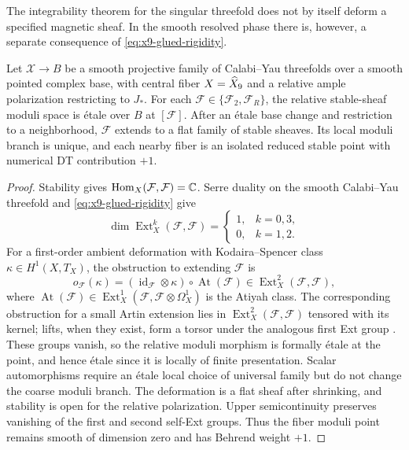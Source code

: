 The integrability theorem for the singular threefold does not by itself
deform a specified magnetic sheaf. In the smooth resolved phase there is,
however, a separate consequence of \eqref{eq:x9-glued-rigidity}.

\begin{proposition}\label{prop:probe-smooth-persistence}
Let $\mathcal X\to B$ be a smooth projective family of Calabi--Yau
threefolds over a smooth pointed complex base, with central fiber
$X=\widehat X_9$ and a relative ample polarization restricting to $J_*$.
For each $\mathcal F\in\{\mathcal F_2,\mathcal F_R\}$, the relative
stable-sheaf moduli space is \textup{\'{e}tale} over $B$ at $[\mathcal F]$.
After an \textup{\'{e}tale} base change and restriction to a neighborhood,
$\mathcal F$ extends to a flat family of stable sheaves. Its local
moduli branch is unique, and each nearby fiber is an isolated reduced
stable point with numerical DT contribution $+1$.
\end{proposition}

\begin{proof}
Stability gives $\operatorname{Hom}_X(\mathcal F,\mathcal F)=\mathbb C$.
Serre duality on the smooth Calabi--Yau threefold and
\eqref{eq:x9-glued-rigidity} give
\begin{equation}
 \dim\operatorname{Ext}^k_X(\mathcal F,\mathcal F)
 =\begin{cases}1,&k=0,3,\\0,&k=1,2.\end{cases}
 \label{eq:probe-spherical-ext}
\end{equation}
For a first-order ambient deformation with Kodaira--Spencer class
$\kappa\in H^1(X,T_X)$, the obstruction to extending $\mathcal F$ is
\begin{equation}
 o_{\mathcal F}(\kappa)
  =(\operatorname{id}_{\mathcal F}\otimes\kappa)
        \circ\operatorname{At}(\mathcal F)
  \in\operatorname{Ext}^2_X(\mathcal F,\mathcal F),
 \label{eq:probe-atiyah-obstruction}
\end{equation}
where $\operatorname{At}(\mathcal F)\in
\operatorname{Ext}^1_X(\mathcal F,\mathcal F\otimes\Omega_X^1)$
is the Atiyah class. The corresponding obstruction for a small Artin
extension lies in $\operatorname{Ext}^2_X(\mathcal F,\mathcal F)$
tensored with its kernel; lifts, when they exist, form a torsor under
the analogous first Ext group
\cite[Section~3]{huybrechtsthomas2010deformations}. These groups vanish,
so the relative moduli morphism is formally \textup{\'{e}tale} at the
point, and hence \textup{\'{e}tale} since it is locally of finite
presentation. Scalar automorphisms require an \textup{\'{e}tale} local
choice of universal family but do not change the coarse moduli branch.
The deformation is a flat sheaf after shrinking, and stability is open
for the relative polarization. Upper semicontinuity preserves vanishing
of the first and second self-Ext groups. Thus the fiber moduli point
remains smooth of dimension zero and has Behrend weight $+1$.
\end{proof}

